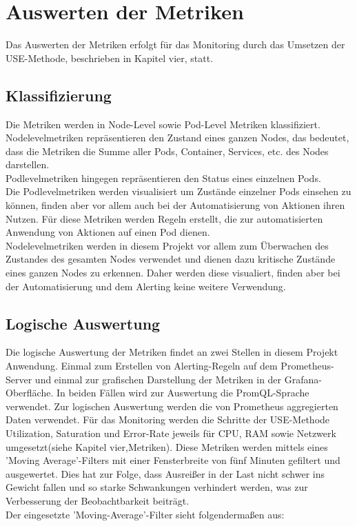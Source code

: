 \documentclass[a4paper,10pt]{scrartcl}
\begin{document}
\section{Auswerten der Metriken}

Das Auswerten der Metriken erfolgt für das Monitoring durch das Umsetzen der USE-Methode, beschrieben in Kapitel vier, statt.

\subsection{Klassifizierung}

Die Metriken werden in Node-Level sowie Pod-Level Metriken klassifiziert.\\
Nodelevelmetriken repräsentieren den Zustand eines ganzen Nodes, das bedeutet, dass die Metriken die Summe aller Pods, Container, Services, etc. des Nodes darstellen.\\
Podlevelmetriken hingegen repräsentieren den Status eines einzelnen Pods.\\
Die Podlevelmetriken werden visualisiert um Zustände einzelner Pods einsehen zu können, finden aber vor allem auch bei der Automatisierung von Aktionen ihren Nutzen. Für diese Metriken werden Regeln erstellt, die zur automatisierten Anwendung von Aktionen auf einen Pod dienen.\\
Nodelevelmetriken werden in diesem Projekt vor allem zum Überwachen des Zustandes des gesamten Nodes verwendet und dienen dazu kritische Zustände eines ganzen Nodes zu erkennen. Daher werden diese visualiert, finden aber bei der Automatisierung und dem Alerting keine weitere Verwendung.

\subsection{Logische Auswertung}

Die logische Auswertung der Metriken findet an zwei Stellen in diesem Projekt Anwendung. Einmal zum Erstellen von Alerting-Regeln auf dem Prometheus-Server und einmal zur grafischen Darstellung der Metriken in der Grafana-Oberfläche. In beiden Fällen wird zur Auswertung die PromQL-Sprache verwendet.
Zur logischen Auswertung werden die von Prometheus aggregierten Daten verwendet. Für das Monitoring werden die Schritte der USE-Methode Utilization, Saturation und Error-Rate jeweils für CPU, RAM sowie Netzwerk umgesetzt(siehe Kapitel vier,Metriken). Diese Metriken werden mittels eines 'Moving Average'-Filters mit einer Fensterbreite von fünf Minuten gefiltert und ausgewertet. Dies hat zur Folge, dass Ausreißer in der Last nicht schwer ins Gewicht fallen und so starke Schwankungen verhindert werden, was zur Verbesserung der Beobachtbarkeit beiträgt.\\
Der eingesetzte 'Moving-Average'-Filter sieht folgendermaßen aus:\\
\end{document}
